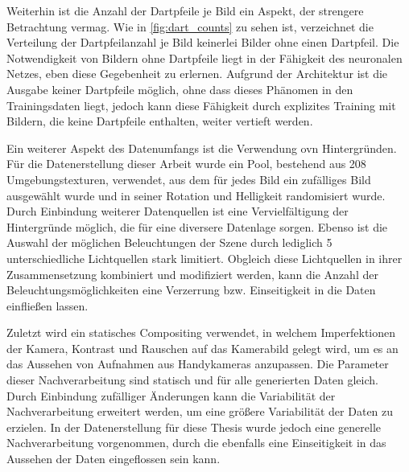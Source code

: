 
Weiterhin ist die Anzahl der Dartpfeile je Bild ein Aspekt, der strengere Betrachtung vermag. Wie in \autoref{fig:dart_counts} zu sehen ist, verzeichnet die Verteilung der Dartpfeilanzahl je Bild keinerlei Bilder ohne einen Dartpfeil. Die Notwendigkeit von Bildern ohne Dartpfeile liegt in der Fähigkeit des neuronalen Netzes, eben diese Gegebenheit zu erlernen. Aufgrund der Architektur ist die Ausgabe keiner Dartpfeile möglich, ohne dass dieses Phänomen in den Trainingsdaten liegt, jedoch kann diese Fähigkeit durch explizites Training mit Bildern, die keine Dartpfeile enthalten, weiter vertieft werden.


Ein weiterer Aspekt des Datenumfangs ist die Verwendung ovn Hintergründen. Für die Datenerstellung dieser Arbeit wurde ein Pool, bestehend aus 208 Umgebungstexturen, verwendet, aus dem für jedes Bild ein zufälliges Bild ausgewählt wurde und in seiner Rotation und Helligkeit randomisiert wurde. Durch Einbindung weiterer Datenquellen ist eine Vervielfältigung der Hintergründe möglich, die für eine diversere Datenlage sorgen. Ebenso ist die Auswahl der möglichen Beleuchtungen der Szene durch lediglich 5 unterschiedliche Lichtquellen stark limitiert. Obgleich diese Lichtquellen in ihrer Zusammensetzung kombiniert und modifiziert werden, kann die Anzahl der Beleuchtungsmöglichkeiten eine Verzerrung bzw. Einseitigkeit in die Daten einfließen lassen.


Zuletzt wird ein statisches Compositing verwendet, in welchem Imperfektionen der Kamera, Kontrast und Rauschen auf das Kamerabild gelegt wird, um es an das Aussehen von Aufnahmen aus Handykameras anzupassen. Die Parameter dieser Nachverarbeitung sind statisch und für alle generierten Daten gleich. Durch Einbindung zufälliger Änderungen kann die Variabilität der Nachverarbeitung erweitert werden, um eine größere Variabilität der Daten zu erzielen. In der Datenerstellung für diese Thesis wurde jedoch eine generelle Nachverarbeitung vorgenommen, durch die ebenfalls eine Einseitigkeit in das Aussehen der Daten eingeflossen sein kann.


